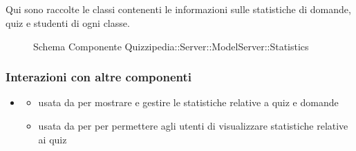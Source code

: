 \subsection{}
Qui sono raccolte le classi contenenti le informazioni sulle statistiche di domande, quiz e studenti di ogni classe.
\begin{figure}[H]
\centering
\noindent{}
\caption[Schema Componente Quizzipedia::Server::ModelServer::Statistics]{Schema Componente Quizzipedia::Server::ModelServer::Statistics}
\end{figure}
\subsubsection{Interazioni con altre componenti}
\begin{itemize}
\item {}
\begin{itemize}
\item usata da  per mostrare e gestire le statistiche relative a quiz e domande
\item usata da  per per permettere agli utenti di visualizzare statistiche relative ai quiz
\end{itemize}
\end{itemize}
